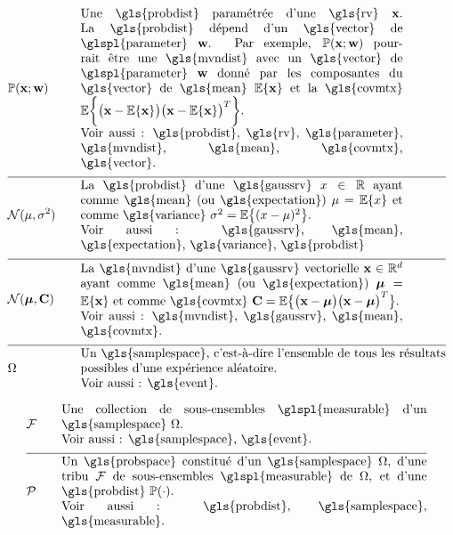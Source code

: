 \begin{align}
	&\prob{\featurevec;\weights} & \quad & \parbox{.75\textwidth}{
		Une \gls{probdist} paramétrée d'une \gls{rv} $\featurevec$. 
		La \gls{probdist} dépend d'un \gls{vector} de \glspl{parameter} $\weights$. Par exemple, $\prob{\featurevec;\weights}$ pourrait être une 
		\gls{mvndist} avec un \gls{vector} de \glspl{parameter} $\weights$ donné par les composantes du \gls{vector} de \gls{mean} $\expect \{ \featurevec \}$ 
		et la \gls{covmtx} $\expect \bigg \{ \big( \featurevec - \expect \{ \featurevec \}\big) \big( \featurevec - \expect \{ \featurevec \}\big)^{T}  \bigg\}$. \\
		Voir aussi : \gls{probdist}, \gls{rv}, \gls{parameter}, \gls{mvndist}, \gls{mean}, \gls{covmtx}, \gls{vector}.} \nonumber \\[2mm] \hline \nonumber\\[-5mm]
	&\mathcal{N}(\mu, \sigma^{2}) & \quad & \parbox{.75\textwidth}{
		La \gls{probdist} d'une 
		\gls{gaussrv} $\feature \in \mathbb{R}$ ayant comme \gls{mean} (ou \gls{expectation}) $\mu= \expect \{ \feature \}$ 
		et comme \gls{variance} $\sigma^{2} =   \expect \big\{  (  \feature - \mu )^2 \big\}$. \\
		Voir aussi : \gls{gaussrv}, \gls{mean}, \gls{expectation}, \gls{variance}, \gls{probdist}
	} \nonumber \\[2mm] \hline \nonumber\\[-5mm]
	&\mathcal{N}(\clustermean, \mathbf{C}) & \quad & \parbox{.75\textwidth}{
		La \gls{mvndist} d'une \gls{gaussrv} vectorielle 
		$\featurevec \in \mathbb{R}^{\featuredim}$ ayant comme \gls{mean} (ou \gls{expectation}) $\clustermean= \expect \{ \featurevec \}$ 
		et comme \gls{covmtx} $\mathbf{C} =  \expect \big\{ \big( \featurevec - \clustermean \big)\big( \featurevec - \clustermean \big)^{T} \big\}$. \\
		Voir aussi : \gls{mvndist}, \gls{gaussrv}, \gls{mean}, \gls{covmtx}.} \nonumber \\[2mm] \hline \nonumber\\[-5mm]
	&\Omega &\quad & \parbox{.85\textwidth}{Un \gls{samplespace}, c’est-à-dire l’ensemble de tous les résultats possibles d’une expérience aléatoire. \\ Voir aussi : \gls{event}.}  \nonumber
\end{align}

\begin{align}
	&\mathcal{F} &\quad & \parbox{.85\textwidth}{Une collection de sous-ensembles \glspl{measurable} d’un \gls{samplespace} $\Omega$. \\ Voir aussi : \gls{samplespace}, \gls{event}.}  \nonumber \\[2mm] \hline \nonumber\\[-5mm]
	&\mathcal{P} &\quad & \parbox{.85\textwidth}{Un \gls{probspace} constitué d’un \gls{samplespace} $\Omega$, d’une tribu $\mathcal{F}$ de sous-ensembles \glspl{measurable} de $\Omega$, et d’une \gls{probdist} $\prob{\cdot}$. \\ Voir aussi : \gls{probdist}, \gls{samplespace}, \gls{measurable}.} \nonumber
\end{align}


